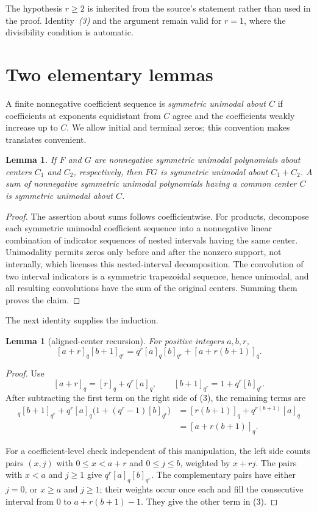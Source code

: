 \documentclass[11pt]{article}
\newtheorem{lemma}[theorem]{Lemma}
\begin{document}
The hypothesis \(r\geq2\) is inherited from the source's statement rather
than used in the proof.  Identity~\emph{(3)} and the argument remain valid
for \(r=1\), where the divisibility condition is automatic.

\section{Two elementary lemmas}

A finite nonnegative coefficient sequence is \emph{symmetric unimodal about
\(C\)} if coefficients at exponents equidistant from \(C\) agree and the
coefficients weakly increase up to \(C\).  We allow initial and terminal
zeros; this convention makes translates convenient.

\begin{lemma}\label{lem:closure}
If \(F\) and \(G\) are nonnegative symmetric unimodal polynomials about
centers \(C_1\) and \(C_2\), respectively, then \(FG\) is symmetric
unimodal about \(C_1+C_2\).  A sum of nonnegative symmetric unimodal
polynomials having a common center \(C\) is symmetric unimodal about \(C\).
\end{lemma}

\begin{proof}
The assertion about sums follows coefficientwise.  For products, decompose
each symmetric unimodal coefficient sequence into a nonnegative linear
combination of indicator sequences of nested intervals having the same
center.  Unimodality permits zeros only before and after the nonzero support,
not internally, which licenses this nested-interval decomposition.  The
convolution of two interval indicators is a symmetric
trapezoidal sequence, hence unimodal, and all resulting convolutions have
the sum of the original centers.  Summing them proves the claim.
\end{proof}

The next identity supplies the induction.

\begin{lemma}[aligned-center recursion]\label{lem:recursion}
For positive integers \(a,b,r\),
\[
 [a+r]_q[b+1]_{q^r}
 =q^r[a]_q[b]_{q^r}+[a+r(b+1)]_q.                  \tag{3}
\]
\end{lemma}

\begin{proof}
Use
\[
 [a+r]_q=[r]_q+q^r[a]_q,
 \qquad
 [b+1]_{q^r}=1+q^r[b]_{q^r}.
\]
After subtracting the first term on the right side of (3), the remaining
terms are
\begin{align*}
 [r]_q[b+1]_{q^r}+q^r[a]_q
       \bigl(1+(q^r-1)[b]_{q^r}\bigr)
 &= [r(b+1)]_q+q^{r(b+1)}[a]_q\\
 &= [a+r(b+1)]_q.
\end{align*}

For a coefficient-level check independent of this manipulation, the left
side counts pairs \((x,j)\) with \(0\leq x<a+r\) and \(0\leq j\leq b\),
weighted by \(x+rj\).  The pairs with \(x<a\) and \(j\geq1\) give
\(q^r[a]_q[b]_{q^r}\).  The complementary pairs have either \(j=0\), or
\(x\geq a\) and \(j\geq1\); their weights occur once each and fill the
consecutive interval from \(0\) to \(a+r(b+1)-1\).  They give the other
term in (3).
\end{proof}
\end{document}
